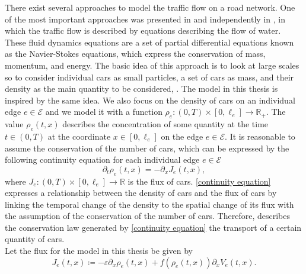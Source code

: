There exist several approaches to model the traffic flow on a road network. One of the most important approaches was presented in \cite{LighthillWhitham:1955} and independently in \cite{Richards:1956}, in which the traffic flow is described by equations describing the flow of water. These fluid dynamics equations are a set of partial differential equations known as the Navier-Stokes equations, which express the conservation of mass, momentum, and energy. The basic idea of this approach is to look at large scales so to consider individual cars as small particles, a set of cars as mass, and their density as the main quantity to be considered, \cite[p.~1]{GaravelloPiccoli:2006}. The model in this thesis is inspired by the same idea. We also focus on the density of cars on an individual edge $e \in \mathcal{E}$ and we model it with a function $\rho_e \colon (0, T) \times [0, \ell_e] \to \mathbb{R}_{+}$. The value $\rho_e (t,x)$ describes the concentration of some quantity at the time $t \in (0, T)$ at the coordinate $x \in [0, \ell_e]$ on the edge $e \in \mathcal{E}$. It is reasonable to assume the conservation of the number of cars, which can be expressed by the following continuity equation for each individual edge $e \in \mathcal{E}$
\begin{equation}
    \label{continuity equation}
    \partial_t \rho_e (t,x) = - \partial_x J_e(t,x),
\end{equation}
where $J_e \colon (0,T) \times [0, \ell_e] \to \mathbb{R}$ is the flux of cars. \cref{continuity equation} expresses a relationship between the density of cars and the flux of cars by linking the temporal change of the density to the spatial change of its flux with the assumption of the conservation of the number of cars. Therefore, describes the conservation law generated by \cref{continuity equation} the transport of a certain quantity of cars. \\
Let the flux for the model in this thesis be given by 
\begin{equation} 
    \label{eq:flux} 
    J_e(t,x) \coloneqq - \varepsilon \partial_x \rho_e (t, x) + f(\rho_e(t, x)) \partial_x V_e(t, x).
\end{equation}
